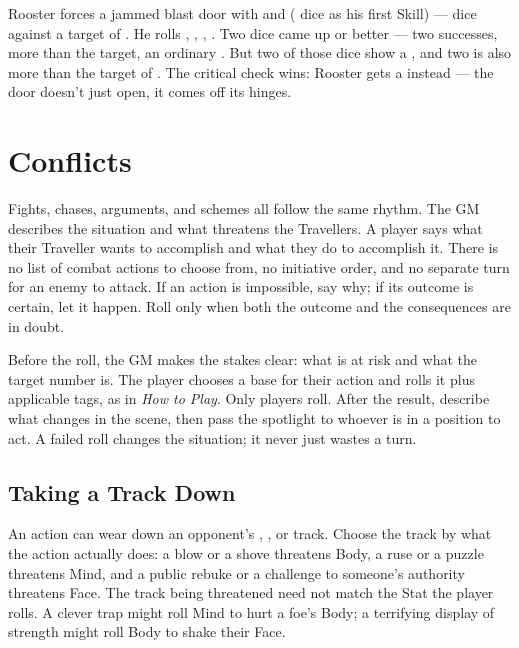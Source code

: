 \begin{example}
Rooster forces a jammed blast door with   and
 ( dice as his first Skill) ---
 dice against a target of . He rolls , ,
, . Two dice came up  or
better --- two successes, more than the target, an ordinary
. But two of those dice show a , and two is also
more than the target of . The critical check wins: Rooster gets a
 instead --- the door doesn't just open, it
comes off its hinges.
\end{example}

\section{Conflicts}
Fights, chases, arguments, and schemes all follow the same rhythm. The GM
describes the situation and what threatens the Travellers. A player says
what their Traveller wants to accomplish and what they do to accomplish
it. There is no list of combat actions to choose from, no initiative
order, and no separate turn for an enemy to attack. If an action is
impossible, say why; if its outcome is certain, let it happen. Roll only
when both the outcome and the consequences are in doubt.

Before the roll, the GM makes the stakes clear: what is at risk and what
the target number is. The player chooses a base  for their
action and rolls it plus applicable tags, as in \emph{How to Play}. Only
players roll. After the result, describe what
changes in the scene, then pass the spotlight to whoever is in a
position to act. A failed roll changes the situation; it never just
wastes a turn.

\subsection*{Taking a Track Down}
An action can wear down an opponent's , , or
 track. Choose the track by what the action actually does:
a blow or a shove threatens Body, a ruse or a puzzle threatens Mind,
and a public rebuke or a challenge to someone's authority threatens
Face. The track being threatened need not match the Stat the player
rolls. A clever trap might roll Mind to hurt a foe's Body; a terrifying
display of strength might roll Body to shake their Face.

